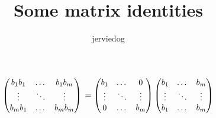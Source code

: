 \documentclass[11pt]{article}
\begin{document}
 
\title{Some matrix identities}
\author{jerviedog}
\maketitle


\begin{equation}
\begin{pmatrix}
b_1b_1 & \dots & b_1b_m \\
\vdots & \ddots & \vdots \\
b_mb_1 & \dots & b_mb_m
\end{pmatrix} \\
= 
\begin{pmatrix}
b_1 & \dots & 0 \\
\vdots & \ddots & \vdots \\
0 & \dots & b_m
\end{pmatrix}
\begin{pmatrix}
b_1 & \dots & b_m \\
\vdots & \ddots & \vdots \\
b_1 & \dots & b_m
\end{pmatrix}
\end{equation}
\end{document}
